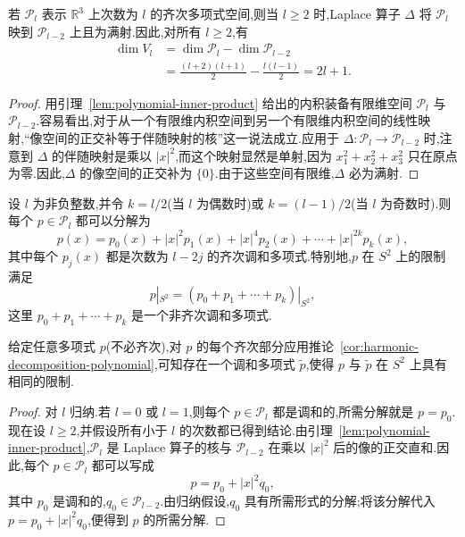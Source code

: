 \begin{corollary}[调和多项式空间的维数]\label{cor:dim-spherical-harmonics}
若 $\mathcal P_l$ 表示 $\mathbb R^3$ 上次数为 $l$ 的齐次多项式空间,则当 $l\ge2$ 时,Laplace 算子 $\Delta$ 将 $\mathcal P_l$ 映到 $\mathcal P_{l-2}$ 上且为满射.因此,对所有 $l\ge2$,有
\[
 \begin{aligned}
 \dim V_l&=\dim\mathcal P_l-\dim\mathcal P_{l-2}\\
 &=\frac{(l+2)(l+1)}2-\frac{l(l-1)}2=2l+1.
 \end{aligned}
\]
\end{corollary}

\begin{proof}
用引理~\ref{lem:polynomial-inner-product} 给出的内积装备有限维空间 $\mathcal P_l$ 与 $\mathcal P_{l-2}$.容易看出,对于从一个有限维内积空间到另一个有限维内积空间的线性映射,“像空间的正交补等于伴随映射的核”这一说法成立.应用于 $\Delta:\mathcal P_l\to\mathcal P_{l-2}$ 时,注意到 $\Delta$ 的伴随映射是乘以 $|x|^2$,而这个映射显然是单射,因为 $x_1^2+x_2^2+x_3^2$ 只在原点为零.因此,$\Delta$ 的像空间的正交补为 $\{0\}$.由于这些空间有限维,$\Delta$ 必为满射.
\end{proof}

\begin{corollary}[齐次多项式的调和分解]\label{cor:harmonic-decomposition-polynomial}
设 $l$ 为非负整数,并令 $k=l/2$(当 $l$ 为偶数时)或 $k=(l-1)/2$(当 $l$ 为奇数时).则每个 $p\in\mathcal P_l$ 都可以分解为
\[
 p(x)=p_0(x)+|x|^2p_1(x)+|x|^4p_2(x)+\cdots+|x|^{2k}p_k(x),
\]
其中每个 $p_j(x)$ 都是次数为 $l-2j$ 的齐次调和多项式.特别地,$p$ 在 $S^2$ 上的限制满足
\[
 p|_{S^2}=(p_0+p_1+\cdots+p_k)|_{S^2},
\]
这里 $p_0+p_1+\cdots+p_k$ 是一个非齐次调和多项式.
\end{corollary}

给定任意多项式 $p$(不必齐次),对 $p$ 的每个齐次部分应用推论~\ref{cor:harmonic-decomposition-polynomial},可知存在一个调和多项式 $\widetilde p$,使得 $p$ 与 $\widetilde p$ 在 $S^2$ 上具有相同的限制.

\begin{proof}
对 $l$ 归纳.若 $l=0$ 或 $l=1$,则每个 $p\in\mathcal P_l$ 都是调和的,所需分解就是 $p=p_0$.现在设 $l\ge2$,并假设所有小于 $l$ 的次数都已得到结论.由引理~\ref{lem:polynomial-inner-product},$\mathcal P_l$ 是 Laplace 算子的核与 $\mathcal P_{l-2}$ 在乘以 $|x|^2$ 后的像的正交直和.因此,每个 $p\in\mathcal P_l$ 都可以写成
\[
 p=p_0+|x|^2q_0,
\]
其中 $p_0$ 是调和的,$q_0\in\mathcal P_{l-2}$.由归纳假设,$q_0$ 具有所需形式的分解;将该分解代入 $p=p_0+|x|^2q_0$,便得到 $p$ 的所需分解.
\end{proof}

